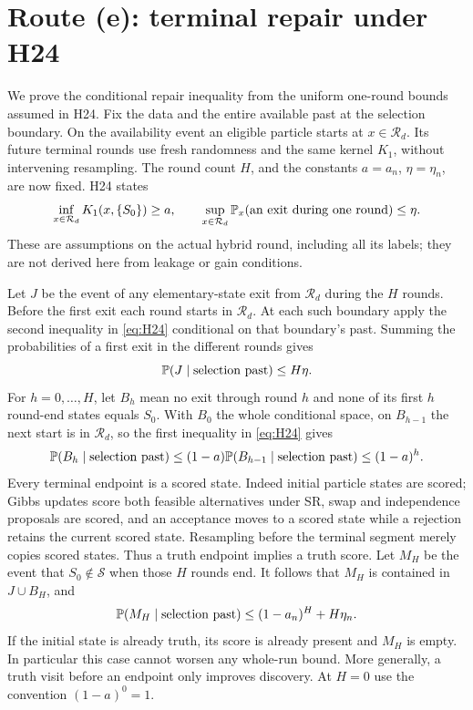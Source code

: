 ﻿\documentclass[11pt]{article}
\newcommand{\Pp}{\mathbb P}
\newcommand{\1}{\mathbf 1}
\newcommand{\Sc}{\mathcal S}
\newcommand{\Rd}{\mathcal R_d}
\begin{document}
\section{Route (e): terminal repair under H24}
We prove the conditional repair inequality from the uniform one-round
bounds assumed in H24. Fix the data and the entire available past at the
selection boundary. On the availability event an eligible particle starts
at \(x\in\Rd\). Its future terminal rounds use fresh randomness and the
same kernel \(K_1\), without intervening resampling. The round count
\(H\), and the constants \(a=a_n\), \(\eta=\eta_n\), are now fixed.
H24 states
\begin{equation}\label{eq:H24}
 \inf_{x\in\Rd}K_1(x,\{S_0\})\ge a,
 \qquad
 \sup_{x\in\Rd}\Pp_x(\hbox{an exit during one round})\le\eta.
\end{equation}
These are assumptions on the actual hybrid round, including all its labels;
they are not derived here from leakage or gain conditions.

Let \(J\) be the event of any elementary-state exit from \(\Rd\) during
the \(H\) rounds. Before the first exit each round starts in \(\Rd\).
At each such boundary apply the second inequality in \eqref{eq:H24}
conditional on that boundary's past. Summing the probabilities of a first
exit in the different rounds gives
\begin{equation}\label{eq:exit}
 \Pp(J\mid\hbox{selection past})\le H\eta.
\end{equation}
For \(h=0,\ldots,H\), let \(B_h\) mean no exit through round \(h\)
and none of its first \(h\) round-end states equals \(S_0\).
With \(B_0\) the whole conditional space, on \(B_{h-1}\) the next start
is in \(\Rd\), so the first inequality in \eqref{eq:H24} gives
\[
 \Pp(B_h\mid\hbox{selection past})
 \le(1-a)\Pp(B_{h-1}\mid\hbox{selection past})\le(1-a)^h.
\]
Every terminal endpoint is a scored state. Indeed initial particle states
are scored; Gibbs updates score both feasible alternatives under SR, swap
and independence proposals are scored, and an acceptance moves to a scored
state while a rejection retains the current scored state. Resampling before
the terminal segment merely copies scored states. Thus a truth endpoint
implies a truth score. Let \(M_H\) be the event that \(S_0\notin\Sc\) when
those \(H\) rounds end. It follows that \(M_H\) is contained in
\(J\cup B_H\), and
\begin{equation}\label{eq:repair}
 \Pp(M_H\mid\hbox{selection past})
 \le(1-a_n)^H+H\eta_n.
\end{equation}
If the initial state is already truth, its score is already present and
\(M_H\) is empty. In particular this case cannot worsen any
whole-run bound. More generally, a truth visit before an endpoint only
improves discovery. At \(H=0\) use the convention \((1-a)^0=1\).
\end{document}

